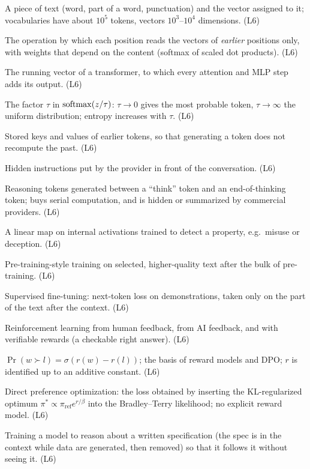 \begin{description}[style=nextline, leftmargin=0pt, itemsep=0.35em]
\item[Token, embedding] A piece of text (word, part of a word, punctuation) and the vector assigned to it; vocabularies have about $10^5$ tokens, vectors $10^3$--$10^4$ dimensions. (L6)
\item[Causal attention] The operation by which each position reads the vectors of \emph{earlier} positions only, with weights that depend on the content (softmax of scaled dot products). (L6)
\item[Residual stream] The running vector of a transformer, to which every attention and MLP step adds its output. (L6)
\item[Temperature] The factor $\tau$ in $\operatorname{softmax}(z/\tau)$: $\tau\to0$ gives the most probable token, $\tau\to\infty$ the uniform distribution; entropy increases with $\tau$. (L6)
\item[KV cache] Stored keys and values of earlier tokens, so that generating a token does not recompute the past. (L6)
\item[System prompt] Hidden instructions put by the provider in front of the conversation. (L6)
\item[Chain of thought] Reasoning tokens generated between a ``think'' token and an end-of-thinking token; buys serial computation, and is hidden or summarized by commercial providers. (L6)
\item[Linear probe] A linear map on internal activations trained to detect a property, e.g.\ misuse or deception. (L6)
\item[Mid-training] Pre-training-style training on selected, higher-quality text after the bulk of pre-training. (L6)
\item[SFT] Supervised fine-tuning: next-token loss on demonstrations, taken only on the part of the text after the context. (L6)
\item[RLHF, RLAIF, RLVR] Reinforcement learning from human feedback, from AI feedback, and with verifiable rewards (a checkable right answer). (L6)
\item[Bradley--Terry model] $\Pr(w\succ l)=\sigma(r(w)-r(l))$; the basis of reward models and DPO; $r$ is identified up to an additive constant. (L6)
\item[DPO] Direct preference optimization: the loss obtained by inserting the KL-regularized optimum $\pi^*\propto\pi_{\mathrm{ref}}e^{r/\beta}$ into the Bradley--Terry likelihood; no explicit reward model. (L6)
\item[Deliberative alignment] Training a model to reason about a written specification (the spec is in the context while data are generated, then removed) so that it follows it without seeing it. (L6)


\end{description}
